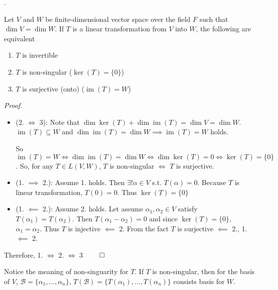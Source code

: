 \documentclass[8pt]{beamer}
\newcommand{\mc}[1]{\mathcal{#1}}
\newcommand{\ti}[1]{\textit{#1}}
\newcommand{\im}{\operatorname{im}}
\begin{document}
\begin{frame}{.}
    \begin{theorem}\label{th:4}
        Let $V$ and $W$ be finite-dimensional vector space over the field $F$ such that $\dim V = \dim W$. If $T$ is a linear transformation from $V$ into $W$, the following are equivalent
        \begin{enumerate}
            \item $T$ is invertible
            \item $T$ is non-singular ($\ker(T) = \{0\}$)
            \item $T$ is surjective (onto) ($\im(T) = W$)
        \end{enumerate}

        \ti{Proof.}
        \begin{itemize}
            \item (2. $\iff$ 3): Note that $\dim \ker (T) + \dim \im (T) = \dim V = \dim W$. $\im(T) \subseteq W$ and $\dim \im(T) = \dim W \implies \im(T) = W$ holds.

            So $\im(T) = W \iff \dim \im(T) = \dim W \iff \dim \ker (T) = 0 \iff \ker (T) = \{0\}$. So, for any $T \in L(V,W)$, $T$ is non-singular $\iff$ $T$ is surjective.
            \item (1. $\implies$ 2.): Assume 1. holds. Then $\exists! \alpha \in V$ s.t. $T(\alpha) = 0$. Because $T$ is linear transformation, $T(0) = 0$. Thus $\ker(T) =\{0\}$
            \item (1. $\impliedby$ 2.): Assume 2. holds. Let assume $\alpha_1, \alpha_2 \in V$ satisfy $T(\alpha_1) = T(\alpha_2)$. Then $T(\alpha_1 - \alpha_2) =0$ and since $\ker(T) = \{0\}$, $\alpha_1 = \alpha_2$. Thus $T$ is injective $\impliedby$ 2. From the fact $T$ is surjective $\impliedby$ 2., 1. $\impliedby$ 2.
        \end{itemize}
        Therefore, 1. $\iff$ 2. $\iff$ 3  $\qed$

        Notice the meaning of non-singuarity for $T$. If $T$ is non-singular, then for the basis of $V$, $\mc{B} = \{\alpha_1, \dots, \alpha_n\}$, $T(\mc{B}) = \{T(\alpha_1), \dots, T(\alpha_n)\}$ consists basis for $W$.
    \end{theorem}
\end{frame}
\end{document}
